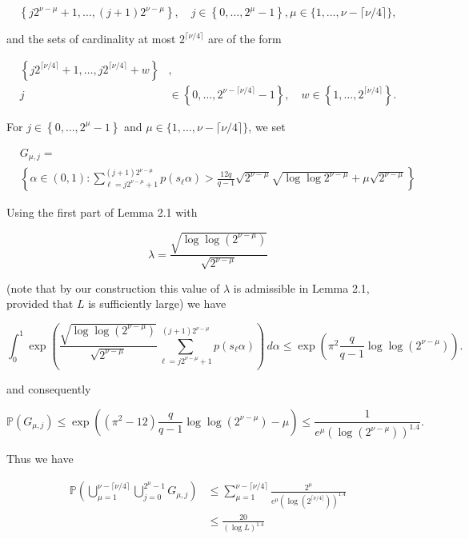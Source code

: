 \documentclass[10pt]{article}
\newcommand{\1}{\mathbf{1}}
\begin{document}
$$
\left\{j 2^{\nu-\mu}+1, \ldots,(j+1) 2^{\nu-\mu}\right\}, \quad j \in\left\{0, \ldots, 2^{\mu}-1\right\}, \mu \in\{1, \ldots, \nu-\lceil\nu / 4\rceil\},
$$

and the sets of cardinality at most $2^{\lceil\nu/4\rceil}$ are of the form

$$
\begin{aligned}
\left\{j2^{\lceil\nu/4\rceil}+1,\ldots, j 2^{\lceil\nu / 4\rceil}+w\right\} & , \\
j & \in\left\{0, \ldots, 2^{\nu-\lceil\nu/4\rceil}-1\right\}, \quad w \in\left\{1, \ldots, 2^{\lceil\nu / 4\rceil}\right\} .
\end{aligned}
$$

For $j \in\left\{0, \ldots, 2^{\mu}-1\right\}$ and $\mu \in\{1, \ldots, \nu-\lceil\nu / 4\rceil\}$, we set

$$
\begin{aligned}
& G_{\mu, j}= \\
& \left\{\alpha \in(0,1): \sum_{\ell=j 2^{\nu-\mu}+1}^{(j+1) 2^{\nu-\mu}} p\left(s_{\ell} \alpha\right)>\frac{12q}{q-1} \sqrt{2^{\nu-\mu}} \sqrt{\log \log 2^{\nu-\mu}}+\mu \sqrt{2^{\nu-\mu}}\right\}
\end{aligned}
$$

Using the first part of Lemma 2.1 with

$$
\lambda=\frac{\sqrt{\log \log \left(2^{\nu-\mu}\right)}}{\sqrt{2^{\nu-\mu}}}
$$

(note that by our construction this value of $\lambda$ is admissible in Lemma 2.1, provided that $L$ is sufficiently large) we have

\[
\int_0^1 \exp\!\left(
 \frac{\sqrt{\log\log(2^{\nu-\mu})}}{\sqrt{2^{\nu-\mu}}}
 \sum_{\ell=j2^{\nu-\mu}+1}^{(j+1)2^{\nu-\mu}}
 p(s_\ell\alpha)
\right)\,d\alpha
\leqslant
\exp\!\left(\pi^2\frac{q}{q-1}\log\log(2^{\nu-\mu})\right).
\]

and consequently

$$
\mathbb{P}\left(G_{\mu, j}\right) \leqslant \exp \left(\left(\pi^2-12\right) \frac{q}{q-1} \log \log \left(2^{\nu-\mu}\right)-\mu\right) \leqslant \frac{1}{e^{\mu}\left(\log \left(2^{\nu-\mu}\right)\right)^{1.4}} .
$$

Thus we have


\begin{align*}
\mathbb{P}\left(\bigcup_{\mu=1}^{\nu-\lceil\nu / 4\rceil} \bigcup_{j=0}^{2^{\mu}-1} G_{\mu, j}\right) & \leqslant \sum_{\mu=1}^{\nu-\lceil\nu / 4\rceil} \frac{2^{\mu}}{e^{\mu}\left(\log \left(2^{\lceil\nu / 4\rceil}\right)\right)^{1.4}} \\
& \leqslant \frac{20}{(\log L)^{1.4}} \tag{3.12}
\end{align*}
\end{document}
